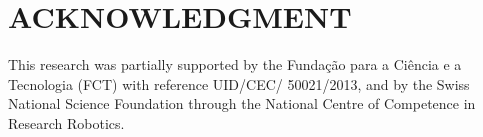 \documentclass[letterpaper, 10 pt, conference]{ieeeconf}  %
\begin{document}








\section*{ACKNOWLEDGMENT}
This research was partially supported by the Funda\c{c}\~{a}o para a Ci\^{e}ncia
e a Tecnologia (FCT) with reference UID/CEC/ 50021/2013, and by the Swiss
National Science Foundation through the National Centre of Competence in
Research Robotics.









\end{document}

